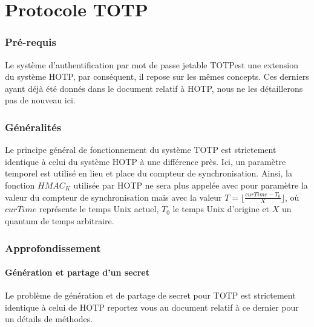 \documentclass{../res/univ-projet}
\begin{document}
\part{Protocole TOTP}

\setcounter{section}{0}
\section{Pré-requis}
Le système d'authentification par mot de passe jetable \og{}TOTP\fg est une extension du système \og{}HOTP\fg{}, par conséquent, il repose sur les mêmes concepts. Ces 
derniers ayant déjà été donnés dans le document relatif à \og{}HOTP\fg{}, nous ne les détaillerons pas de nouveau ici.

\section{Généralités}
Le principe général de fonctionnement du système \og{}TOTP\fg{} est strictement identique à celui du système \og{}HOTP\fg{} à une différence près. Ici, un paramètre 
temporel est utilisé en lieu et place du compteur de synchronisation. Ainsi, la fonction $HMAC_K$ utilisée par \og{}HOTP\fg{} ne sera plus appelée avec pour paramètre la 
valeur du compteur de synchronisation mais avec la valeur $T = \lfloor{}\frac{curTime - T_0}{X}\rfloor{}$, où $curTime$ représente le temps Unix actuel, $T_0$ le temps Unix \og{}
d'origine\fg{} et $X$ un quantum de temps arbitraire.

\section{Approfondissement}
  \subsection{Génération et partage d'un secret}
    Le problème de génération et de partage de secret pour \og{}TOTP\fg{} est strictement identique à celui de \og{}HOTP\fg{} reportez vous au document relatif à ce 
    dernier pour un détails de méthodes.
    
\end{document}
